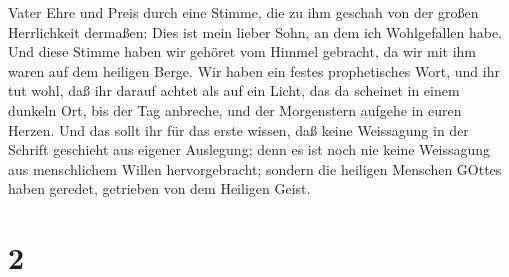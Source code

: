 Vater Ehre und Preis durch eine Stimme, die zu ihm geschah von der
großen Herrlichkeit dermaßen: Dies ist mein lieber Sohn, an dem ich
Wohlgefallen habe.  Und diese Stimme haben wir gehöret vom
Himmel gebracht, da wir mit ihm waren auf dem heiligen Berge.
 Wir haben ein festes prophetisches Wort, und ihr tut wohl,
daß ihr darauf achtet als auf ein Licht, das da scheinet in einem
dunkeln Ort, bis der Tag anbreche, und der Morgenstern aufgehe in euren
Herzen.  Und das sollt ihr für das erste wissen, daß keine
Weissagung in der Schrift geschieht aus eigener Auslegung; 
denn es ist noch nie keine Weissagung aus menschlichem Willen
hervorgebracht; sondern die heiligen Menschen GOttes haben geredet,
getrieben von dem Heiligen Geist.

\hypertarget{section-1}{%
\section{2}\label{section-1}}

